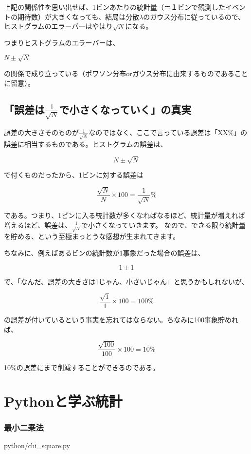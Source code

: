 \documentclass[uplatex]{jsarticle}
\begin{document}
上記の関係性を思い出せば、1ビンあたりの統計量（＝１ビンで観測したイベントの期待数）が大きくなっても、結局は分散$\lambda$のガウス分布に従っているので、ヒストグラムのエラーバーはやはり$\sqrt{N}$になる。

つまりヒストグラムのエラーバーは、

$N\pm\sqrt{N}$

の関係で成り立っている（ポワソン分布orガウス分布に由来するものであることに留意）。


\subsection{「誤差は$\frac{1}{\sqrt{N}}$で小さくなっていく」の真実}
誤差の大きさそのものが$\frac{1}{\sqrt{N}}$なのではなく、ここで言っている誤差は「XX\%」の誤差に相当するものである。ヒストグラムの誤差は、

\begin{equation}
  N\pm\sqrt{N}
\end{equation}

で付くものだったから、1ビンに対する誤差は

\begin{equation}
  \frac{\sqrt{N}}{N}\times 100 = \frac{1}{\sqrt{N}} \%
\end{equation}

である。つまり、1ビンに入る統計数が多くなればなるほど、統計量が増えれば増えるほど、誤差は、$\frac{1}{\sqrt{N}}$で小さくなっていきます。
なので、できる限り統計量を貯める、という至極まっとうな感想が生まれてきます。

ちなみに、例えばあるビンの統計数が1事象だった場合の誤差は、

\begin{equation}
  1\pm 1
\end{equation}

で、「なんだ、誤差の大きさは1じゃん、小さいじゃん」と思うかもしれないが、

\begin{equation}
  \frac{\sqrt{1}}{1}\times 100 = 100 \%
\end{equation}

の誤差が付いているという事実を忘れてはならない。ちなみに100事象貯めれば、

\begin{equation}
  \frac{\sqrt{100}}{100}\times 100 = 10 \%
\end{equation}

10\%の誤差にまで削減することができるのである。



\section{Pythonと学ぶ統計}
\subsubsection{最小二乗法}
python/chi\_square.py 
\end{document}
